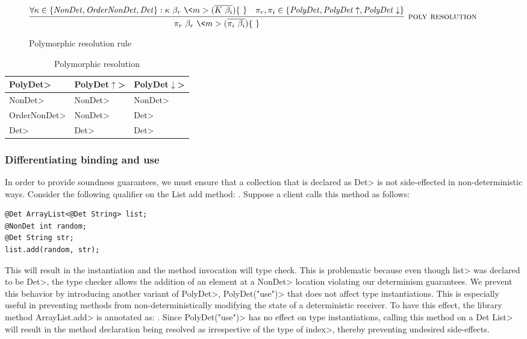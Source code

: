 \begin{figure}
    $\infer[\textsc{poly resolution}]{\pi_r \ \beta_r\ \<m>(\overline{\pi_i \ \beta_i})\{\ \}}{\forall \kappa \in \{\|NonDet, OrderNonDet, Det|\} : \kappa \ \beta_r\ \<m>(\overline{K \ \beta_i})\{\ \} & \pi_r, \pi_i \in \{\|PolyDet|, \|PolyDet|\uparrow, \|PolyDet|\downarrow    \}}$
    \caption{Polymorphic resolution rule}
    \label{fig-poly-resolution}
\end{figure}

\begin{table}[]
    \begin{tabular}{|l|l|l|}
        \hline
        \textbf{\<PolyDet>} & \textbf{\<PolyDet$\uparrow$>} & \textbf{\<PolyDet$\downarrow$>} \\ \hline
        \<NonDet> & \<NonDet> &  \<NonDet>\\ \hline
        \<OrderNonDet> & \<NonDet> &  \<Det>\\ \hline
        \<Det> & \<Det> &  \<Det>\\ \hline
    \end{tabular}
\caption{Polymorphic resolution}
\label{tab-poly-resolutions}
\end{table}

\subsubsection{Differentiating binding and use}\label{bindings-uses}

In order to provide soundness guarantees, we must ensure that a collection that is
declared as \<Det> is not side-effected in non-deterministic ways. Consider the following qualifier 
on the List add method: .
Suppose a client calls this method as follows:
\begin{verbatim}
@Det ArrayList<@Det String> list;
@NonDet int random;
@Det String str;
list.add(random, str);
\end{verbatim}
This will result in the instantiation  and
the method invocation will type check. This is problematic because even though \<list> was declared to be \<Det>,
the type checker allows the addition of an element at a \<NonDet> location violating our determinism guarantees.
We prevent this behavior by introducing another variant of \<PolyDet>, \<PolyDet("use")> that does not affect
type instantiations. This is especially useful in preventing methods from non-deterministically modifying the state
of a deterministic receiver. To have this effect, the library method \<ArrayList.add> is annotated as:
.
Since \<PolyDet("use")> has no effect on type instantiations, calling this method on a \<Det List>
will result in the method declaration being resolved as 
irrespective of the type of \<index>, thereby preventing undesired side-effects.

